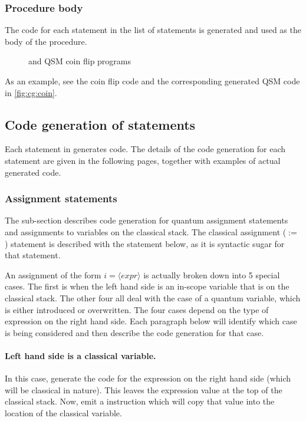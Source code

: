 \subsubsection{Procedure body}
The code for each statement in the list of statements is generated and used as the 
body of the procedure.
\begin{figure}[htbp]
\centering
{}\qquad
{}
\caption{\lqpl{} and QSM coin flip programs}\label{fig:cg:coin}
\end{figure}
As an example, see the coin flip code and the corresponding generated QSM code
in \vref{fig:cg:coin}.

\subsection{Code generation of statements}\label{subsec:cgstatements}
Each statement in \lqpl{} generates code. The details of the
code generation for each statement are given in the following pages, together
with examples of actual generated code.
\subsubsection{Assignment statements}
The sub-section describes code generation for quantum assignment statements and
assignments to variables on the classical stack. The classical assignment ($:=$)
statement is described with the  statement below, as it is
syntactic sugar for that statement.

An assignment of the form $i = \langle expr \rangle$ is actually 
broken down into 5 special cases. The first is when the left hand side is
an in-scope variable that is on the classical stack. The other four all 
deal with the case of a quantum variable, which is either introduced or
overwritten. The four cases depend on the type of expression on the 
right hand side. Each paragraph  below will identify which case is
being considered and then describe the code generation for that case.

\paragraph{Left hand side is a classical variable.} In this case, generate
the code for the expression on the right hand side (which will be classical
in nature). This leaves the expression value at the top of the classical
stack. Now, emit a  instruction which will copy that value
into the location of the classical variable.

